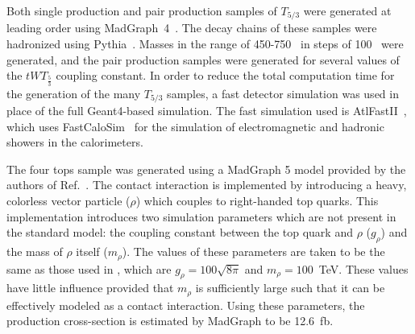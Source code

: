 Both single production and pair production samples of $T_{5/3}$ were generated at leading order using {\sc MadGraph}~4~\cite{Alwall:2007st}.
The decay chains of these samples were hadronized using {\sc Pythia}~\cite{PYTHIA6.4}.
Masses in the range of 450-750~\GeV{} in steps of 100~\GeV{} were generated, and the pair production samples were generated for several values of the $tWT_{\frac{5}{3}}$ coupling constant.
In order to reduce the total computation time for the generation of the many $T_{5/3}$ samples, a fast detector simulation was used in place of the full {\sc Geant4}-based simulation. 
The fast simulation used is {\sc AtlFastII}~\cite{Richter-Was:683751}, which uses {\sc FastCaloSim}~\cite{Yamanaka:1322202} for the simulation of electromagnetic and hadronic showers in the calorimeters.


The four tops sample was generated using a {\sc MadGraph} 5 model provided by the authors of Ref.~\cite{Degrande:2010ds}.
The contact interaction is implemented by introducing a heavy, colorless vector particle ($\rho$) which couples to right-handed top quarks.
This implementation introduces two simulation parameters which are not present in the standard model: the coupling constant between the top quark and $\rho$ ($g_\rho$) and the mass of $\rho$ itself ($m_\rho$).
The values of these parameters are taken to be the same as those used in \cite{Degrande:2010ds}, which are $g_\rho=100\sqrt{8\pi}$ and $m_\rho=100$~TeV.
These values have little influence provided that  $m_\rho$ is sufficiently large such that it can be effectively modeled as a contact interaction.
Using these parameters, the production cross-section is estimated by {\sc MadGraph} to be 12.6~fb.

